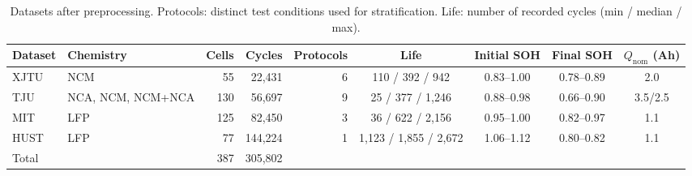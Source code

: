 \begin{table}[t]\centering\small
\caption{Datasets after preprocessing. Protocols: distinct test conditions used for stratification. Life: number of recorded cycles (min / median / max).}\label{tab:data}
\begin{adjustbox}{max width=\textwidth}\begin{tabular}{llrrrcccc}\toprule
Dataset & Chemistry & Cells & Cycles & Protocols & Life & Initial SOH & Final SOH & $Q_\text{nom}$ (Ah) \\\midrule
XJTU & NCM & 55 & 22,431 & 6 & 110 / 392 / 942 & 0.83--1.00 & 0.78--0.89 & 2.0 \\
TJU & NCA, NCM, NCM+NCA & 130 & 56,697 & 9 & 25 / 377 / 1,246 & 0.88--0.98 & 0.66--0.90 & 3.5/2.5 \\
MIT & LFP & 125 & 82,450 & 3 & 36 / 622 / 2,156 & 0.95--1.00 & 0.82--0.97 & 1.1 \\
HUST & LFP & 77 & 144,224 & 1 & 1,123 / 1,855 / 2,672 & 1.06--1.12 & 0.80--0.82 & 1.1 \\
\midrule Total & & 387 & 305,802 & & & & & \\
\bottomrule\end{tabular}\end{adjustbox}\end{table}
